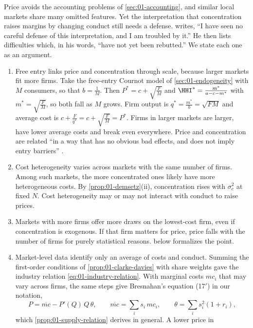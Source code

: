 Price avoids the accounting problems of \cref{sec:01-accounting}, and similar local markets share many
omitted features. Yet the interpretation that concentration raises margins by changing conduct still
needs a defense. \citet[p.~1043]{Bresnahan1989} writes, ``I have seen no careful defense of this
interpretation, and I am troubled by it.'' He then lists difficulties which, in his words, ``have not
yet been rebutted.'' We state each one as an argument.
\begin{enumerate}[label=(\roman*)]
\item Free entry links price and concentration through scale, because larger markets fit more
firms. Take the free-entry Cournot model of \cref{sec:01-endogeneity} with $M$ consumers, so that
$b = \frac{1}{M}$. Then $P^* = c + \sqrt{\frac{F}{M}}$ and $\HHI^* = \frac{m^*}{a - c - m^*}$ with
$m^* = \sqrt{\frac{F}{M}}$, so both fall as $M$ grows. Firm output is $q^* = \frac{m^*}{b} = \sqrt{FM}$ and
average cost is $c + \frac{F}{q^*} = c + \sqrt{\frac{F}{M}} = P^*$. Firms in larger markets are larger,
have lower
average costs and break even everywhere. Price and concentration are related ``in a way that has no
obvious bad effects, and does not imply entry barriers'' \citep[p.~1044]{Bresnahan1989}.
\item Cost heterogeneity varies across markets with the same number of firms. Among such markets, the
more concentrated ones likely have more heterogeneous costs. By \cref{prop:01-demsetz}(ii),
concentration rises with $\sigma_c^2$ at fixed $N$. Cost heterogeneity may or may not interact with
conduct to raise prices.
\item Markets with more firms offer more draws on the lowest-cost firm, even if concentration is
exogenous. If that firm matters for price, price falls with the number of firms for purely
statistical reasons.  below formalizes the point.
\item Market-level data identify only an average of costs and conduct. Summing the first-order
conditions of \cref{prop:01-clarke-davies} with share weights gave the industry relation
\eqref{eq:01-industry-relation}. With marginal costs $mc_i$ that may vary across firms, the same steps
give Bresnahan's equation (17$'$) in our notation,
\begin{equation}\label{eq:01-avg-supply}
P = \overline{mc} - P'(Q) \, Q \, \theta, \qquad
\overline{mc} = \sum_i s_i \, mc_i, \qquad \theta = \sum_i s_i^2 (1 + r_i),
\end{equation}
which \cref{prop:01-supply-relation} derives in general. A lower price in

\end{enumerate}
